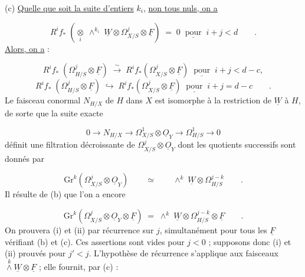 (c) \underline{Quelle que soit la suite d'entiers} $k_i$, \underline{non tous nuls, on a}

\begin{equation*}
R^i f_* \; (\underset{i}{\otimes} \; \wedge^{k_i} \; \underline{W} \otimes \Omega^j_{X/S} \otimes \underline{F}) \;=\; 0 \;\; \underline{\text{pour}} \;\; i+j < d \qquad .
\end{equation*}
\underline{Alors, on a} :

\begin{equation*}\tag{i}
R^i f_* \; (\Omega^j_{H/S} \otimes \underline{F}) \; \overset{\sim}{\longrightarrow} \; R^i f_*(\Omega^j_{X/S} \otimes \underline{F}) \;\; \underline{\text{pour}} \;\; i+j < d-c,
\end{equation*}
\begin{equation}\tag{ii}
R^i f_* \; (\Omega^j_{H/S} \otimes \underline{F}) \; \hookrightarrow \; R^i f_*(\Omega^j_{X/S} \otimes \underline{F}) \;\; \underline{\text{pour}} \;\; i+j = d-c \qquad .
\end{equation}
Le faisceau conormal $N_{H/X}$ de $H$ dans $X$ est isomorphe à la restriction de $\underline{W}$ à $H$, de sorte que la suite exacte

\begin{equation}\tag{1.3.1}
0 \longrightarrow N_{H/X} \longrightarrow \Omega^1_{X/S} \otimes \underline{O}_Y \longrightarrow \Omega^1_{H/S} \longrightarrow 0
\end{equation}
définit une filtration décroissante de $\Omega^j_{X/S} \otimes \underline{O}_Y$ dont les quotients successifs sont donnés par

\begin{equation}\tag{1.3.2}
\mathrm{Gr}^k(\Omega^j_{X/S} \otimes \underline{O}_Y) \qquad \simeq \qquad \wedge^k \; \underline{W} \otimes \Omega^{j-k}_{H/S} \qquad .
\end{equation}
Il résulte de (b) que l'on a encore

\begin{equation}\tag{1.3.3}
\mathrm{Gr}^k(\Omega^j_{X/S} \otimes \underline{O}_Y \otimes \underline{F}) \;=\; \wedge^k \; \underline{W} \otimes \Omega^{j-k}_{H/S} \otimes \underline{F} \qquad .
\end{equation}
On prouvera (i) et (ii) par récurrence sur $j$, simultanément pour tous les $\underline{F}$ vérifiant (b) et (c). Ces assertions sont vides pour $j < 0$ ;
supposons donc (i) et (ii) prouvés pour $j' < j$. L'hypothèse de récurrence s'applique aux faisceaux $\stackrel{k}{\wedge} \underline{W} \otimes \underline{F}$ ; elle fournit, par (c) :

